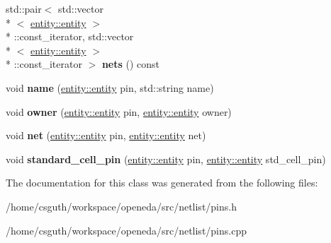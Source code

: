 \begin{DoxyCompactItemize}
\item 
\hypertarget{classophidian_1_1netlist_1_1pins_ac15cbe453588d8f70872b4af3b88b0ad}{std\-::pair$<$ std\-::vector\\*
$<$ \hyperlink{classophidian_1_1entity_1_1entity}{entity\-::entity} $>$\\*
\-::const\-\_\-iterator, std\-::vector\\*
$<$ \hyperlink{classophidian_1_1entity_1_1entity}{entity\-::entity} $>$\\*
\-::const\-\_\-iterator $>$ {\bfseries nets} () const }\label{classophidian_1_1netlist_1_1pins_ac15cbe453588d8f70872b4af3b88b0ad}

\item 
\hypertarget{classophidian_1_1netlist_1_1pins_a3b8bccccc6715c439096fed1fc0ba9d7}{void {\bfseries name} (\hyperlink{classophidian_1_1entity_1_1entity}{entity\-::entity} pin, std\-::string name)}\label{classophidian_1_1netlist_1_1pins_a3b8bccccc6715c439096fed1fc0ba9d7}

\item 
\hypertarget{classophidian_1_1netlist_1_1pins_a6bd2568dc16421a13e9cb89053a3f912}{void {\bfseries owner} (\hyperlink{classophidian_1_1entity_1_1entity}{entity\-::entity} pin, \hyperlink{classophidian_1_1entity_1_1entity}{entity\-::entity} owner)}\label{classophidian_1_1netlist_1_1pins_a6bd2568dc16421a13e9cb89053a3f912}

\item 
\hypertarget{classophidian_1_1netlist_1_1pins_a32688650533a13614a51c43eca20f048}{void {\bfseries net} (\hyperlink{classophidian_1_1entity_1_1entity}{entity\-::entity} pin, \hyperlink{classophidian_1_1entity_1_1entity}{entity\-::entity} net)}\label{classophidian_1_1netlist_1_1pins_a32688650533a13614a51c43eca20f048}

\item 
\hypertarget{classophidian_1_1netlist_1_1pins_afe613b9cb71c2ad677e8e2367b8a5984}{void {\bfseries standard\-\_\-cell\-\_\-pin} (\hyperlink{classophidian_1_1entity_1_1entity}{entity\-::entity} pin, \hyperlink{classophidian_1_1entity_1_1entity}{entity\-::entity} std\-\_\-cell\-\_\-pin)}\label{classophidian_1_1netlist_1_1pins_afe613b9cb71c2ad677e8e2367b8a5984}

\end{DoxyCompactItemize}


The documentation for this class was generated from the following files\-:\begin{DoxyCompactItemize}
\item 
/home/csguth/workspace/openeda/src/netlist/pins.\-h\item 
/home/csguth/workspace/openeda/src/netlist/pins.\-cpp\end{DoxyCompactItemize}

